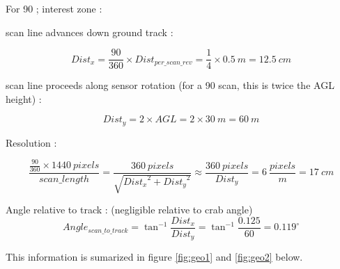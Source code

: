 \documentclass[a4paper,11pt]{report}
\begin{document}
For 90 \degree; interest zone :

scan line advances down ground track :

\begin{equation} 
Dist_{x}=  \frac{90}{360} \times Dist_{per\_scan\_rev} = \frac{1}{4} \times 0.5~m = 12.5~cm
\end{equation}

scan line proceeds along sensor rotation (for a 90 scan, this is twice the AGL height) :

\begin{equation} 
Dist_{y}=  2 \times AGL = 2 \times 30~m = 60~m
\end{equation}

Resolution :

\begin{equation}  
\frac{ \frac{90}{360} \times 1440~pixels }{scan\_length} = 
\frac{360~pixels}{\sqrt{{Dist_x}^2+{Dist_y}^2}} \approx \frac{360~pixels}{Dist_y}= 6~ \frac{pixels}{m} = 17~cm
\end{equation}

Angle relative to track : (negligible relative to crab angle)
\begin{equation} Angle_{scan\_to\_track} = \tan^{-1} \frac{Dist_x}{Dist_y} = \tan^{-1} \frac{0.125}{60} = 0.119^\circ
\end{equation}

This information is sumarized in figure \ref{fig:geo1} and \ref{fig:geo2} below.
\end{document}
